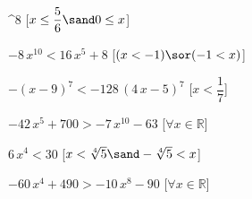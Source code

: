 \begin{esercizio}
\begin{enumeratea}
^{8}\) 
\hfill [\(x\leq {\dfrac{5}{6}} \sand 0\leq x\)]
\item \(-8\,{x}^{10}<16\,{x}^{5}+8\) 
\hfill [\((x<-1)\sor (-1<x)\)]
\item \(- \left( x-9 \right) ^{7}<-128\, \left( 4\,x-5 \right) ^{7}\) 
\hfill [\(x<{\dfrac{1}{7}}\)]
\item \(-42\,{x}^{5}+700>-7\,{x}^{10}-63\) 
\hfill [\(\forall x \in \mathbb{R}\)]
\item \(6\,{x}^{4}<30\) 
\hfill [\(x<\sqrt [4]{5} \sand -\sqrt [4]{5}<x\)]
\item \(-60\,{x}^{4}+490>-10\,{x}^{8}-90\) 
\hfill [\(\forall x \in \mathbb{R}\)]
\end{enumeratea}
\end{esercizio}

